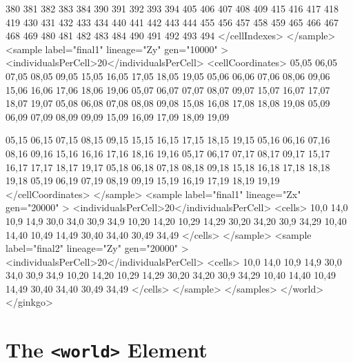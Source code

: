 \documentclass[11pt]{article}
\newcommand{\xmlelem}[1]{{\tt<\textcolor{xmlelem}{#1}>}}
\begin{document}
\begin{ginkgoxml}
                    380 381 382 383 384      390 391 392 393 394
                    405 406 407 408 409      415 416 417 418 419
                    430 431 432 433 434      440 441 442 443 444
                    455 456 457 458 459      465 466 467 468 469
                    480 481 482 483 484      490 491 492 493 494
                </cellIndexes>
            </sample>
            <sample label="final1" lineage="Zy" gen="10000" >
                <individualsPerCell>20</individualsPerCell>
                <cellCoordinates>
                    05,05 06,05 07,05 08,05 09,05    15,05 16,05 17,05 18,05 19,05
                    05,06 06,06 07,06 08,06 09,06    15,06 16,06 17,06 18,06 19,06
                    05,07 06,07 07,07 08,07 09,07    15,07 16,07 17,07 18,07 19,07
                    05,08 06,08 07,08 08,08 09,08    15,08 16,08 17,08 18,08 19,08
                    05,09 06,09 07,09 08,09 09,09    15,09 16,09 17,09 18,09 19,09

                    05,15 06,15 07,15 08,15 09,15    15,15 16,15 17,15 18,15 19,15
                    05,16 06,16 07,16 08,16 09,16    15,16 16,16 17,16 18,16 19,16
                    05,17 06,17 07,17 08,17 09,17    15,17 16,17 17,17 18,17 19,17
                    05,18 06,18 07,18 08,18 09,18    15,18 16,18 17,18 18,18 19,18
                    05,19 06,19 07,19 08,19 09,19    15,19 16,19 17,19 18,19 19,19
                </cellCoordinates>
            </sample>
            <sample label="final1" lineage="Zx" gen="20000" >
                <individualsPerCell>20</individualsPerCell>
                <cells>
                    10,0  14,0   10,9   14,9     30,0  34,0  30,9  34,9
                    10,20 14,20  10,29  14,29    30,20 34,20 30,9  34,29
                    10,40 14,40  10,49  14,49    30,40 34,40 30,49 34,49
                </cells>
            </sample>
            <sample label="final2" lineage="Zy" gen="20000" >
                <individualsPerCell>20</individualsPerCell>
                <cells>
                    10,0  14,0   10,9   14,9     30,0  34,0  30,9  34,9
                    10,20 14,20  10,29  14,29    30,20 34,20 30,9  34,29
                    10,40 14,40  10,49  14,49    30,40 34,40 30,49 34,49
                </cells>
            </sample>
        </samples>
    </world>
</ginkgo>
\end{ginkgoxml}



\section{The \xmlelem{world} Element}
\end{document}
